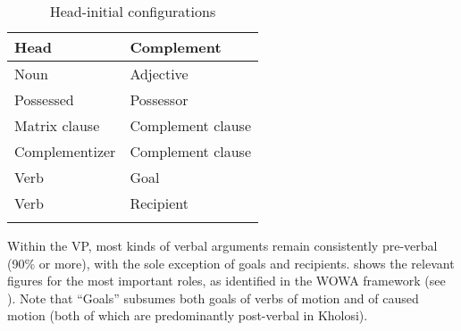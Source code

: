 \documentclass[output=paper,colorlinks,citecolor=brown]{langscibook}
\begin{document}
\begin{table}
  \caption{\label{tab:6:configurations}Head-initial configurations}
\begin{tabular}{ll}
\lsptoprule
\textbf{Head} & \textbf{Complement} \\
\midrule
Noun & Adjective \\
Possessed & Possessor \\
Matrix clause & Complement clause \\
Complementizer & Complement clause \\
Verb & Goal \\
Verb & Recipient \\
\lspbottomrule
\end{tabular}
\end{table}

Within the VP, most kinds of verbal arguments remain consistently pre-verbal (90\% or more), with the sole exception of goals and recipients.  shows the relevant figures for the most important roles, as identified in the WOWA framework (see ). Note that ``Goals'' subsumes both goals of verbs of motion and of caused motion (both of which are predominantly post-verbal in Kholosi).

\begin{table}
    \caption{Percentages of post-predicate placement of different constituents in Kholosi}
    \label{Kholosi:tab:2}
\end{table}
					
\end{document}
